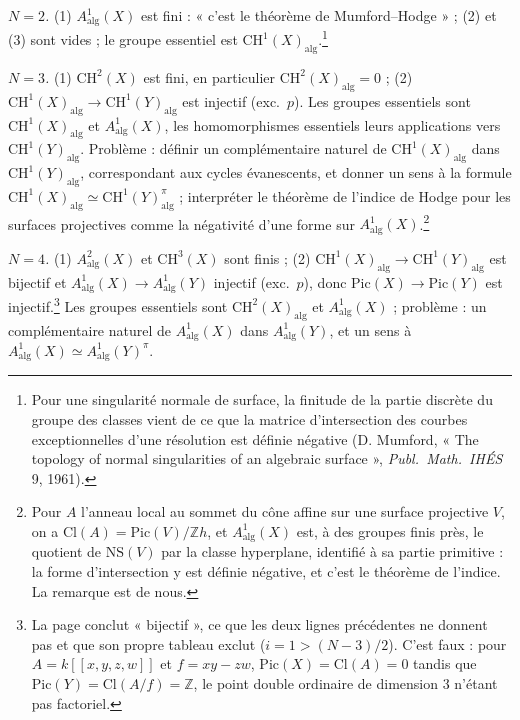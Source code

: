\documentclass[11pt,a4paper]{article}
\begin{document}
\emph{$N = 2$.} (1) $A^{1}_{\mathrm{alg}}(X)$ est fini : « c'est le théorème de
Mumford--Hodge » ; (2) et (3) sont vides ; le groupe essentiel est
$\mathrm{CH}^{1}(X)_{\mathrm{alg}}$.\footnote{Pour une singularité normale de
surface, la finitude de la partie discrète du groupe des classes vient de ce
que la matrice d'intersection des courbes exceptionnelles d'une résolution est
définie négative (D. Mumford, « The topology of normal singularities of an
algebraic surface », \emph{Publ.\ Math.\ IHÉS} 9, 1961).}

\emph{$N = 3$.} (1) $\mathrm{CH}^{2}(X)$ est fini, en particulier
$\mathrm{CH}^{2}(X)_{\mathrm{alg}} = 0$ ; (2) $\mathrm{CH}^{1}(X)_{\mathrm{alg}}
\to \mathrm{CH}^{1}(Y)_{\mathrm{alg}}$ est injectif (exc.\ $p$). Les groupes
essentiels sont $\mathrm{CH}^{1}(X)_{\mathrm{alg}}$ et $A^{1}_{\mathrm{alg}}(X)$,
les homomorphismes essentiels leurs applications vers
$\mathrm{CH}^{1}(Y)_{\mathrm{alg}}$. Problème : définir un complémentaire
naturel de $\mathrm{CH}^{1}(X)_{\mathrm{alg}}$ dans
$\mathrm{CH}^{1}(Y)_{\mathrm{alg}}$, correspondant aux cycles évanescents, et
donner un sens à la formule $\mathrm{CH}^{1}(X)_{\mathrm{alg}} \simeq
\mathrm{CH}^{1}(Y)_{\mathrm{alg}}^{\pi}$ ; interpréter le théorème de l'indice
de Hodge pour les surfaces projectives comme la négativité d'une forme sur
$A^{1}_{\mathrm{alg}}(X)$.\footnote{Pour $A$ l'anneau local au sommet du cône
affine sur une surface projective $V$, on a $\mathrm{Cl}(A) =
\mathrm{Pic}(V)/\mathbb{Z}h$, et $A^{1}_{\mathrm{alg}}(X)$ est, à des groupes
finis près, le quotient de $\mathrm{NS}(V)$ par la classe hyperplane, identifié à
sa partie primitive : la forme d'intersection y est définie négative, et c'est
le théorème de l'indice. La remarque est de nous.}

\emph{$N = 4$.} (1) $A^{2}_{\mathrm{alg}}(X)$ et $\mathrm{CH}^{3}(X)$ sont finis ;
(2) $\mathrm{CH}^{1}(X)_{\mathrm{alg}} \to \mathrm{CH}^{1}(Y)_{\mathrm{alg}}$ est
bijectif et $A^{1}_{\mathrm{alg}}(X) \to A^{1}_{\mathrm{alg}}(Y)$ injectif (exc.\ $p$), donc $\mathrm{Pic}(X) \to \mathrm{Pic}(Y)$ est injectif.\footnote{La page
conclut « bijectif », ce que les deux lignes précédentes ne donnent pas et que
son propre tableau exclut ($i = 1 > (N-3)/2$). C'est faux : pour $A =
k[[x,y,z,w]]$ et $f = xy - zw$, $\mathrm{Pic}(X) = \mathrm{Cl}(A) = 0$ tandis que
$\mathrm{Pic}(Y) = \mathrm{Cl}(A/f) = \mathbb{Z}$, le point double ordinaire de
dimension $3$ n'étant pas factoriel.} Les groupes essentiels sont
$\mathrm{CH}^{2}(X)_{\mathrm{alg}}$ et $A^{1}_{\mathrm{alg}}(X)$ ; problème :
un complémentaire naturel de $A^{1}_{\mathrm{alg}}(X)$ dans
$A^{1}_{\mathrm{alg}}(Y)$, et un sens à $A^{1}_{\mathrm{alg}}(X) \simeq
A^{1}_{\mathrm{alg}}(Y)^{\pi}$.
\end{document}
